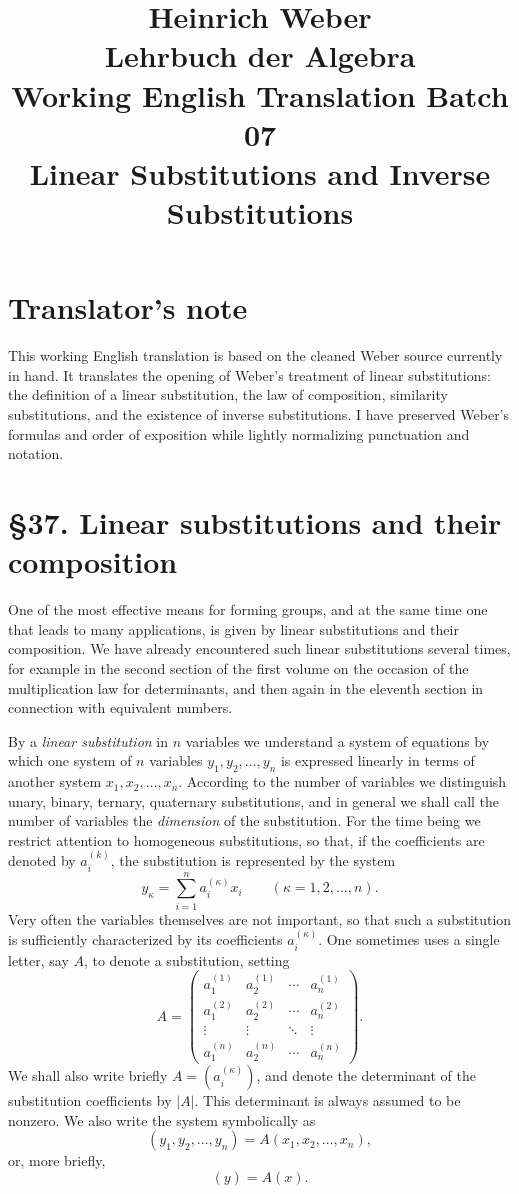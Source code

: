 \documentclass[11pt]{article}
\title{Heinrich Weber\\Lehrbuch der Algebra\\Working English Translation Batch 07\\Linear Substitutions and Inverse Substitutions}
\author{}
\date{}
\begin{document}
\maketitle

\section*{Translator's note}
This working English translation is based on the cleaned Weber source currently in hand. It translates the opening of Weber's treatment of linear substitutions: the definition of a linear substitution, the law of composition, similarity substitutions, and the existence of inverse substitutions. I have preserved Weber's formulas and order of exposition while lightly normalizing punctuation and notation.

\section*{\S 37. Linear substitutions and their composition}

One of the most effective means for forming groups, and at the same time one that leads to many applications, is given by linear substitutions and their composition. We have already encountered such linear substitutions several times, for example in the second section of the first volume on the occasion of the multiplication law for determinants, and then again in the eleventh section in connection with equivalent numbers.

By a \emph{linear substitution} in \(n\) variables we understand a system of equations by which one system of \(n\) variables \(y_1,y_2,\dots,y_n\) is expressed linearly in terms of another system \(x_1,x_2,\dots,x_n\). According to the number of variables we distinguish unary, binary, ternary, quaternary substitutions, and in general we shall call the number of variables the \emph{dimension} of the substitution. For the time being we restrict attention to homogeneous substitutions, so that, if the coefficients are denoted by \(a^{(k)}_i\), the substitution is represented by the system
\[
y_\kappa=\sum_{i=1}^n a^{(\kappa)}_i x_i
\qquad (\kappa=1,2,\dots,n).
\tag{1}
\]
Very often the variables themselves are not important, so that such a substitution is sufficiently characterized by its coefficients \(a^{(\kappa)}_i\). One sometimes uses a single letter, say \(A\), to denote a substitution, setting
\[
A=
\begin{pmatrix}
a^{(1)}_1 & a^{(1)}_2 & \cdots & a^{(1)}_n \\
a^{(2)}_1 & a^{(2)}_2 & \cdots & a^{(2)}_n \\
\vdots & \vdots & \ddots & \vdots \\
a^{(n)}_1 & a^{(n)}_2 & \cdots & a^{(n)}_n
\end{pmatrix}.
\tag{2}
\]
We shall also write briefly \(A=(a^{(\kappa)}_i)\), and denote the determinant of the substitution coefficients by \(|A|\). This determinant is always assumed to be nonzero. We also write the system symbolically as
\[
(y_1,y_2,\dots,y_n)=A(x_1,x_2,\dots,x_n),
\tag{3}
\]
or, more briefly,
\[
(y)=A(x).
\tag{4}
\]
\end{document}
